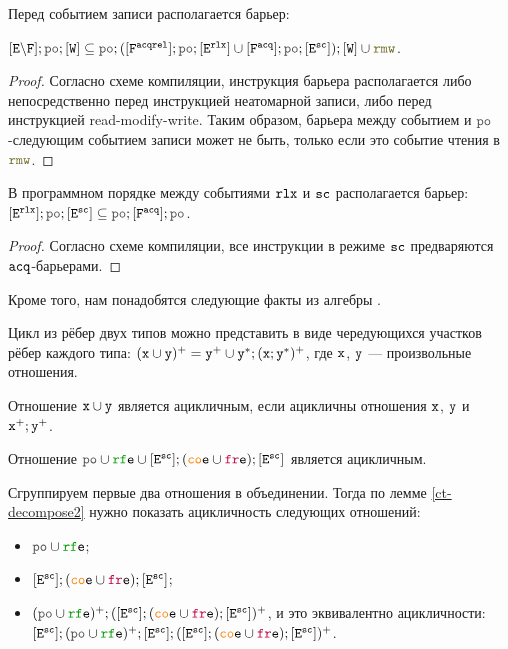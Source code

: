 \documentclass[14pt]{matmex-diploma-custom}
\newcommand{\Fa}{\lF^{\acq}}
\newcommand{\Far}{\lF^{\acqrel}}
\begin{document}
\begin{lemma}  \label{sb-w-sync}
  Перед событием записи располагается барьер:

  $[\lE \backslash \lF] ; \lPO ; [\lW] \subseteq \lPO ; ([\Far] ; \lPO ; [\lE^{\rlx}] \cup [\Fa] ; \lPO ; [\lE^{\sco}]) ; [\lW] \cup \lRMW$.
\end{lemma}
\begin{proof}
  Согласно схеме компиляции, инструкция барьера располагается либо непосредственно перед инструкцией неатомарной записи, либо перед инструкцией read-modify-write. Таким образом, барьера между событием и $\lPO$-следующим событием записи может не быть, только если это событие чтения в $\lRMW$.
\end{proof}

\begin{lemma}  \label{sb-sc-sync}
  В программном порядке между событиями $\mathtt{rlx}$ и ${\mathtt{sc}}$ располагается барьер:  $[\lE^{\rlx}] ; \lPO ; [\lE^{\sco}] \subseteq \lPO ; [\Fa] ; \lPO$.
\end{lemma}
\begin{proof}
  Согласно схеме компиляции, все инструкции в режиме ${\mathtt{sc}}$ предваряются ${\mathtt{acq}}$-барьерами. 
\end{proof}

Кроме того, нам понадобятся следующие факты из алгебры \cite{hahn-repo}.

\begin{lemma} \label{ct-decompose1}
  Цикл из рёбер двух типов можно представить в виде чередующихся участков рёбер каждого типа: $(\mathtt{x} \cup \mathtt{y})^{+} = \mathtt{y}^{+} \cup \mathtt{y}^{*} ; (\mathtt{x} ; \mathtt{y}^{*})^{+}$, где $\mathtt{x}$, $\mathtt{y}$ --- произвольные отношения.
\end{lemma}

\begin{lemma} \label{ct-decompose2}
  Отношение $\mathtt{x}\cup \mathtt{y}$ является ацикличным, если ацикличны отношения $\mathtt{x}$, $\mathtt{y}$ и $\mathtt{x}^{+};\mathtt{y}^{+}$.
\end{lemma}

\begin{theorem} \label{corr-causality-thm}
  Отношение $\lPO \cup \lRFE \cup [\lE^{\sco}] ; (\lCOE \cup \lFRE) ; [\lE^{\sco}]$ является ацикличным. 
\end{theorem}

Сгруппируем первые два отношения в объединении. Тогда по лемме \ref{ct-decompose2} нужно показать ацикличность следующих отношений:
\begin{itemize}
\item $\lPO \cup \lRFE$;
\item $[\lE^{\sco}] ; (\lCOE \cup \lFRE) ; [\lE^{\sco}]$;
\item $(\lPO \cup \lRFE)^{+} ; ([\lE^{\sco}] ; (\lCOE \cup \lFRE) ; [\lE^{\sco}])^{+}$, и это эквивалентно ацикличности:  $[\lE^{\sco}];(\lPO \cup \lRFE)^{+} ; [\lE^{\sco}] ; ([\lE^{\sco}] ; (\lCOE \cup \lFRE) ; [\lE^{\sco}])^{+}$. 
\end{itemize}
\end{document}
